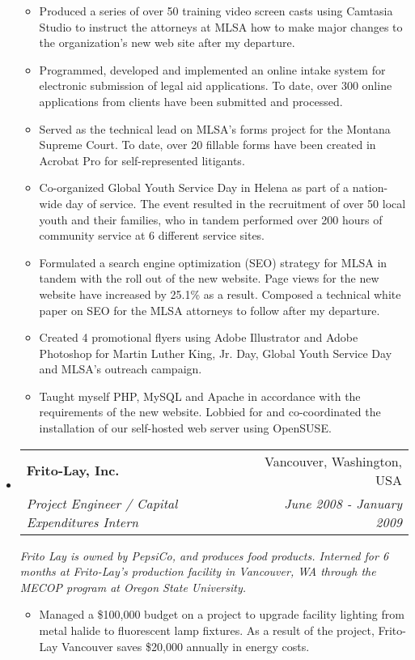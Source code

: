 \documentclass[a4paper,11pt]{article}
\makeatletter
\newcommand{\resitem}[1]{\item #1 \vspace{-2pt}}
\newcommand{\ressubheading}[4]{
\begin{tabular*}{6.5in}{l@{\cftdotfill{\cftsecdotsep}\extracolsep{\fill}}r}
		\textbf{#1} & #2 \\
		\textit{#3} & \textit{#4} \\
\end{tabular*}\vspace{-6pt}}
\makeatother
\begin{document}
\begin{itemize}
\begin{itemize}
			\resitem{Produced a series of over 50 training video screen casts using Camtasia Studio to instruct the attorneys at MLSA how to make major changes to the organization’s new web site after my departure.}

			\resitem{Programmed, developed and implemented an online intake system for electronic submission of legal aid applications. To date, over 300 online applications from clients have been submitted and processed.}

			\resitem{Served as the technical lead on MLSA’s forms project for the Montana Supreme Court. To date, over 20 fillable forms have been created in Acrobat Pro for self-represented litigants.}

			\resitem{Co-organized Global Youth Service Day in Helena as part of a nation-wide day of service. The event resulted in the recruitment of over 50 local youth and their families, who in tandem performed over 200 hours of community service at 6 different service sites.}

			\resitem{Formulated a search engine optimization (SEO) strategy for MLSA in tandem with the roll out of the new website. Page views for the new website have increased by 25.1\% as a result. Composed a technical white paper on SEO for the MLSA attorneys to follow after my departure.}

			\resitem{Created 4 promotional flyers using Adobe Illustrator and Adobe Photoshop for Martin Luther King, Jr. Day, Global Youth Service Day and MLSA’s outreach campaign.}

			\resitem{Taught myself PHP, MySQL and Apache in accordance with the requirements of the new website. Lobbied for and co-coordinated the installation of our self-hosted web server using OpenSUSE.}

	\end{itemize}

\item

	\ressubheading{Frito-Lay, Inc.}{Vancouver, Washington, USA}{Project Engineer / Capital Expenditures Intern}{June 2008 - January 2009}
	\linebreak
	\linebreak
	\emph{Frito Lay is owned by PepsiCo, and produces food products. Interned for 6 months at Frito-Lay’s production facility in Vancouver, WA through the MECOP program at Oregon State University.}
	\begin{itemize}
			\resitem{Managed a \$100,000 budget on a project to upgrade facility lighting from metal halide to fluorescent lamp fixtures. As a result of the project, Frito-Lay Vancouver saves \$20,000 annually in energy costs.}


\end{itemize}
\end{itemize}
\end{document}
